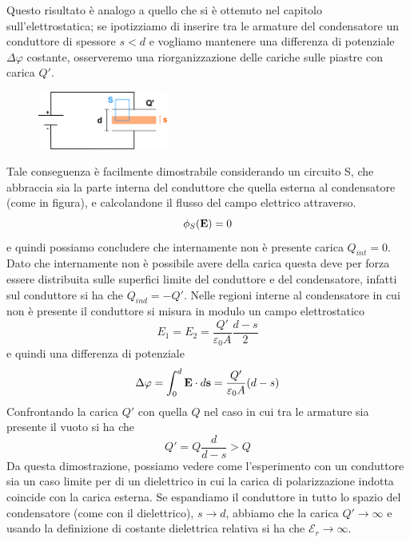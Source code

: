 Questo risultato \`e analogo a quello che si \`e ottenuto nel capitolo sull'elettrostatica; se ipotizziamo di inserire tra le armature del condensatore un conduttore di spessore $s < d $ e vogliamo mantenere una differenza di potenziale $\Delta \varphi$ costante, osserveremo una riorganizzazione delle cariche sulle piastre con carica $Q'$.

\begin{figure} %
    \centering
    \includegraphics[width=0.38\textwidth]{images/faraday_conduct1} %
\end{figure}
Tale conseguenza \`e facilmente dimostrabile considerando un circuito S, che abbraccia sia la parte interna del conduttore che quella esterna al condensatore (come in figura), e calcolandone il flusso del campo elettrico attraverso.
\begin{equation*}
	\phi_S(\bold{E}) = 0
\end{equation*}
e quindi possiamo concludere che internamente non \`e presente carica $Q_{int} = 0$. Dato che internamente non \`e possibile avere della carica questa deve per forza essere distribuita sulle superfici limite del conduttore e del condensatore, infatti sul conduttore si ha che $Q_{ind} = - Q'$. Nelle regioni  interne al condensatore in cui non \`e presente il conduttore si misura in modulo un campo elettrostatico
\begin{equation*}
	E_1 = E_2 = \frac{Q'}{\varepsilon_0 A} \frac{d -s}{2}
\end{equation*} 
e quindi una differenza di potenziale 
\begin{equation*}
	\Delta \varphi = \int_0^d \bold{E} \cdot d \bold{s} = \frac{Q'}{\varepsilon_0A}(d-s)
\end{equation*}
Confrontando la carica $Q'$ con quella $Q$ nel caso in cui tra le armature sia presente il vuoto si ha che 
\begin{equation*}
	Q' = Q \frac{d}{d-s} > Q
\end{equation*}
Da questa dimostrazione, possiamo vedere come l'esperimento con un conduttore sia un caso limite per  di un dielettrico in cui la carica di polarizzazione indotta coincide con la carica esterna. Se espandiamo il conduttore in tutto lo spazio del condensatore (come con il dielettrico), $s \to d$, abbiamo che la carica $Q' \to \infty$ e usando la definizione di costante dielettrica relativa si ha che $\mathcal{E}_r \to \infty$. 

